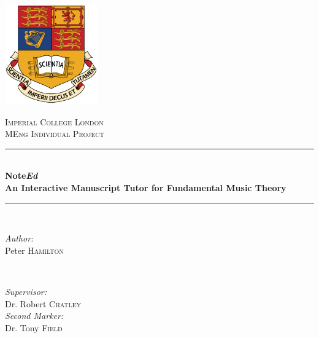 
\begin{titlepage}

\newcommand{\HRule}{\rule{\linewidth}{0.5mm}} %

\begin{center} %


\includegraphics[width=0.3\textwidth]{gfx/icl-crest.jpg}

\textsc{\LARGE Imperial College London}\\[1.5cm] %
\textsc{\Large MEng Individual Project}\\[0.5cm] %


\HRule \\[0.4cm]
{ \Large \bfseries Note\emph{Ed}}\\[0.4cm]
{ \large \bfseries An Interactive Manuscript Tutor for Fundamental Music Theory }\\[0.3cm]
\HRule \\[1.5cm]


\begin{minipage}{0.4\textwidth}
\begin{flushleft} \large
\emph{Author:}\\
Peter \textsc{Hamilton}
\end{flushleft}
\end{minipage}
~
\begin{minipage}{0.4\textwidth}
\begin{flushright} \large
\emph{Supervisor:} \\
Dr. Robert \textsc{Chatley}
\\[0.5cm]
\emph{Second Marker:} \\
Dr. Tony \textsc{Field}
\end{flushright}
\end{minipage}\\[4cm]


\end{center}
\end{titlepage}
